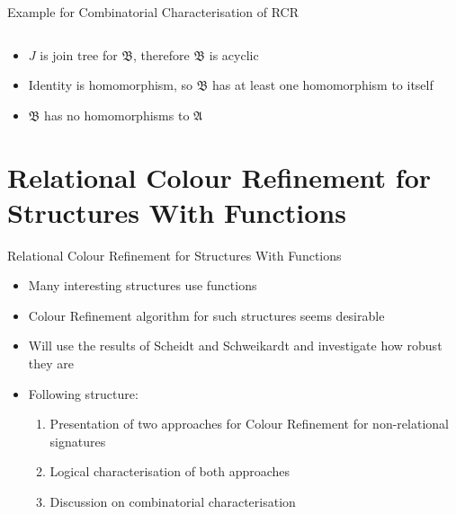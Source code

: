 \documentclass[aspectratio=169]{beamer}
\begin{document}
\begin{frame}{Example for Combinatorial Characterisation of RCR}
\begin{columns}
\begin{column}{0.33\textwidth}
			\end{column}
		\end{columns}
		\vspace{10pt}
		\begin{itemize}
			\item $J$ is join tree for $\mathfrak B$, therefore $\mathfrak B$ is acyclic
			\item Identity is homomorphism, so $\mathfrak B$ has at least one homomorphism to itself
			\item $\mathfrak B$ has no homomorphisms to $\mathfrak A$
		\end{itemize}
	\end{frame}
	
	\section{Relational Colour Refinement for Structures With Functions}
	
	\begin{frame}{Relational Colour Refinement for Structures With Functions}
		\begin{itemize}
			\item Many interesting structures use functions
			\item Colour Refinement algorithm for such structures seems desirable
			\item Will use the results of Scheidt and Schweikardt and investigate how robust they are
			\item Following structure:
			\begin{enumerate}
				\item Presentation of two approaches for Colour Refinement for non-relational signatures
				\item Logical characterisation of both approaches
				\item Discussion on combinatorial characterisation
			\end{enumerate}
		\end{itemize}
	\end{frame}
	
\end{document}
